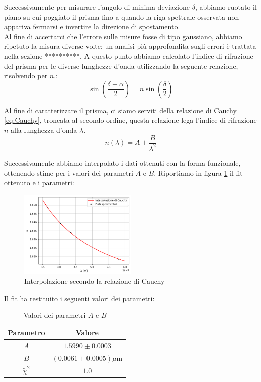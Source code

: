\documentclass[letterpaper,12pt]{article}
\begin{document}
Successivamente per misurare l'angolo di minima deviazione $\delta$, abbiamo ruotato il piano su cui poggiato il prisma fino a quando
la riga spettrale osservata non appariva fermarsi e invertire la direzione di spostamento. \\
Al fine di accertarci che l'errore sulle misure fosse di tipo gaussiano, abbiamo ripetuto la misura diverse volte; un analisi più
approfondita sugli errori è trattata nella sezione **********.
A questo punto abbiamo calcolato l'indice di rifrazione del prisma per le diverse lunghezze d'onda utilizzando la seguente relazione, risolvendo per $n$.:
\begin{equation}
    \sin(\frac{\delta + \alpha}{2}) = n \sin(\frac{\delta}{2})
    \label{eq:indice}
\end{equation}

Al fine di caratterizzare il prisma, ci siamo serviti della relazione di Cauchy \eqref{eq:Cauchy}, troncata al secondo ordine,
questa relazione lega l'indice di rifrazione $n$ alla lunghezza d'onda $\lambda$.
\begin{equation}
    n(\lambda) = A + \frac{B}{\lambda^2}
    \label{eq:Cauchy}
\end{equation}

Successivamente abbiamo interpolato i dati ottenuti con la forma funzionale, ottenendo stime per i valori dei parametri $A$ e $B$.
Riportiamo in figura \ref{fig:Cauchy_fit} il fit ottenuto e i parametri:
\begin{figure}[h!]
    \centering
    \includegraphics[width = 0.5\textwidth]{Cauchy_fit.png}
    \caption{Interpolazione secondo la relazione di Cauchy}
    \label{fig:Cauchy_fit}
\end{figure}

Il fit ha restituito i seguenti valori dei parametri:
\begin{table}[h!]
    \centering
    \begin{tabular}{|c|c|}
    \hline
    \textbf{Parametro} & \textbf{Valore} \\
    \hline
    $A$ & $1.5990 \pm 0.0003$ \\
    \hline
    $B$ & $(0.0061 \pm 0.0005) \mu$m \\
    \hline
    $\tilde{\chi}^2$ & $1.0$ \\
    \hline
    \end{tabular}
    \caption{Valori dei parametri $A$ e $B$}
    \label{tab:cauchy_fit}
\end{table}
\end{document}
